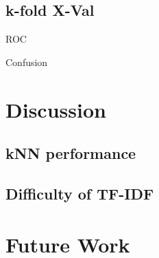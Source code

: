 \documentclass[10pt,twocolumn]{article}
\begin{document}
\subsection*{k-fold X-Val}

ROC

Confusion
 
\section*{Discussion}

\subsection*{kNN performance}

\subsection*{Difficulty of TF-IDF}

\section*{Future Work}
\end{document}
